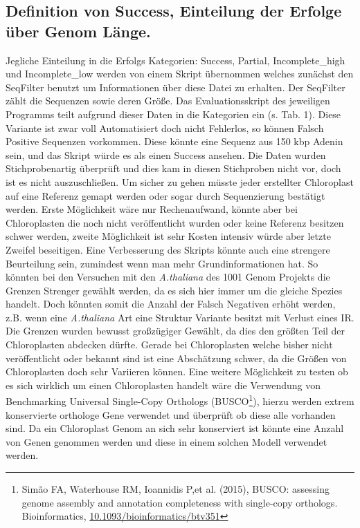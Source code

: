 \documentclass{scrartcl}
\begin{document}
\subsection{Definition von Success, Einteilung der Erfolge über Genom Länge.}
\label{sec-5-1}
Jegliche Einteilung in die Erfolgs Kategorien: Success, Partial, Incomplete\_high und Incomplete\_low werden von einem Skript übernommen welches zunächst den SeqFilter benutzt um Informationen über diese Datei zu erhalten. 
Der SeqFilter zählt die Sequenzen sowie deren Größe. Das Evaluationsskript des jeweiligen Programms teilt aufgrund dieser Daten in die Kategorien ein (s. Tab. 1). Diese Variante ist zwar voll Automatisiert
doch nicht Fehlerlos, so können Falsch Positive Sequenzen vorkommen. Diese könnte eine Sequenz aus 150 kbp Adenin sein, und das Skript würde es als einen Success ansehen. Die Daten wurden Stichprobenartig überprüft und dies 
kam in diesen Stichproben nicht vor, doch ist es nicht auszuschließen. Um sicher zu gehen müsste jeder erstellter Chloroplast auf eine Referenz gemapt werden oder sogar durch Sequenzierung bestätigt werden. Erste Möglichkeit
wäre nur Rechenaufwand, könnte aber bei Chloroplasten die noch nicht veröffentlicht wurden oder keine Referenz besitzen schwer werden, zweite Möglichkeit ist sehr Kosten intensiv würde aber letzte Zweifel beseitigen. 
Eine Verbesserung des Skripts könnte auch eine strengere Beurteilung sein, zumindest wenn man mehr Grundinformationen hat. So könnten bei den Versuchen mit den \emph{A.thaliana} des 1001 Genom Projekts die Grenzen Strenger gewählt werden, 
da es sich hier immer um die gleiche Spezies handelt. Doch könnten somit die Anzahl der Falsch Negativen erhöht werden, z.B. wenn eine \emph{A.thaliana} Art eine Struktur Variante besitzt mit Verlust eines IR. Die Grenzen wurden 
bewusst großzügiger Gewählt, da dies den größten Teil der Chloroplasten abdecken dürfte. Gerade bei Chloroplasten welche bisher nicht veröffentlicht oder bekannt sind ist eine Abschätzung schwer, da die Größen von Chloroplasten
doch sehr Variieren können. Eine weitere Möglichkeit zu testen ob es sich wirklich um einen Chloroplasten handelt wäre die Verwendung von Benchmarking Universal Single-Copy Orthologs (BUSCO\footnote{Simão FA, Waterhouse RM, Ioannidis P,et al. (2015), BUSCO: assessing genome assembly and annotation completeness with single-copy orthologs.  Bioinformatics, \url{10.1093/bioinformatics/btv351}}), hierzu werden extrem konservierte
orthologe Gene verwendet und überprüft ob diese alle vorhanden sind. Da ein Chloroplast Genom an sich sehr konserviert ist könnte eine Anzahl von Genen genommen werden und diese in einem solchen Modell verwendet werden. 
\end{document}
